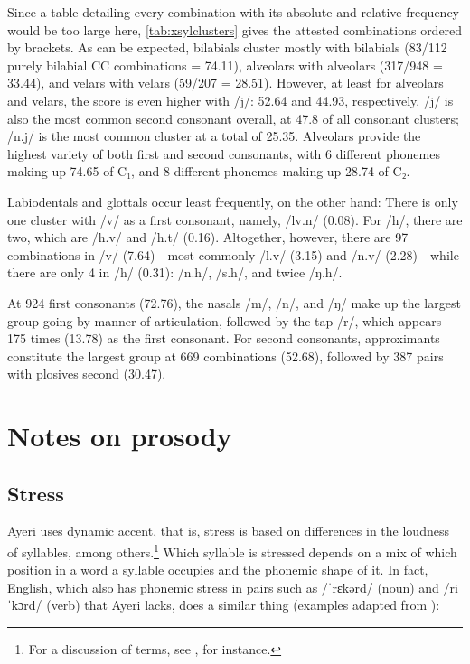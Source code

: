 Since a table detailing every combination with its absolute and relative 
frequency would be too large here, \autoref{tab:xsylclusters} gives the 
attested combinations ordered by brackets. As can be expected, bilabials 
cluster mostly with bilabials (83/112 purely bilabial CC combinations = 
74.11\pct), alveolars with alveolars (317/948 = 33.44\pct), and velars with 
velars (59/207 = 28.51\pct). However, at least for alveolars and velars, 
the score is even higher with /j/: 52.64\pct{} and 44.93\pct{}, respectively. 
/j/ is also the most common second consonant overall, at 47.8\pct{} of all 
consonant clusters; /n.j/ is the most common cluster at a total of 25.35\pct{}. 
Alveolars provide the highest variety of both first and second consonants, with 
6 different phonemes making up 74.65\pct{} of C₁, and 8 different phonemes 
making up 28.74\pct{} of C₂.

Labiodentals and glottals occur least frequently, on the other hand: There is 
only one cluster with /v/ as a first consonant, namely, /lv.n/ (0.08\pct). 
For /h/, there are two, which are /h.v/ and /h.t/ (0.16\pct). Altogether, 
however, there are 97 combinations in /v/ (7.64\pct)---most commonly /l.v/ 
(3.15\pct) and /n.v/ (2.28\pct)---while there are only 4 in /h/ (0.31\pct): 
/n.h/, /s.h/, and twice /ŋ.h/.

At 924 first consonants (72.76\pct), the nasals /m/, /n/, and /ŋ/ make up the 
largest group going by manner of articulation, followed by the tap /r/, which 
appears 175 times (13.78\pct) as the first consonant. For second consonants, 
approximants constitute the largest group at 669 combinations (52.68\pct), 
followed by 387 pairs with plosives second (30.47\pct).
%

\section{Notes on prosody}

\subsection{Stress}

Ayeri uses dynamic accent, that is, stress is based on differences in the 
loudness of syllables, among others.\footnote{For a discussion of terms, see 
\citet{kager2007}, for instance.} Which syllable is stressed depends on a mix 
of which position in a word a syllable occupies and the phonemic shape of it. 
In fact, English, which also has phonemic stress in pairs such as  
/ˈrɛkərd/ (noun) and /riˈkɔrd/ (verb) that Ayeri lacks, does a similar thing 
(examples adapted from \cite[552]{halle1998}):

